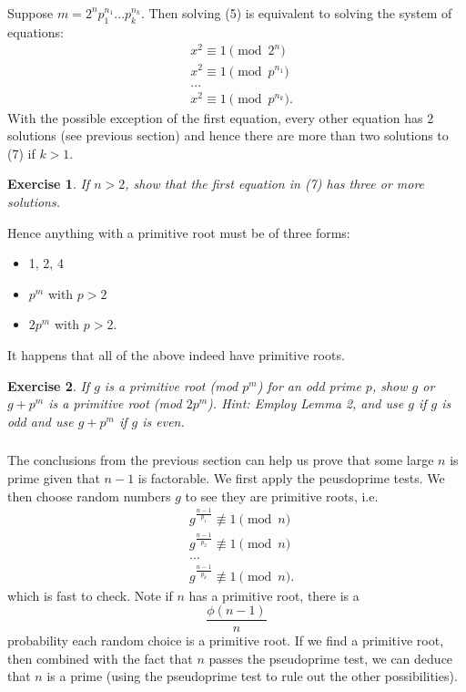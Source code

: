 \documentclass{article}
\newtheorem{exercise}{Exercise}
\begin{document}
\subsubsection{}
Suppose $m = 2^{n}p_{1}^{n_{1}}...p_{k}^{n_{k}}$. Then solving (5) is equivalent to solving the system of equations:
\begin{equation}
\begin{split}
    &x^{2} \equiv 1 \pmod{2^{n}}\\
    &x^{2} \equiv 1 \pmod{p^{n_{1}}}\\
    &. . .\\
    &x^{2} \equiv 1 \pmod{p^{n_{k}}}.
\end{split}
\end{equation}
With the possible exception of the first equation, every other equation has 2 solutions (see previous section) and hence there are more than two solutions to (7) if $k > 1$.
\begin{exercise}
    If $n > 2$, show that the first equation in (7) has three or more solutions.
\end{exercise}
Hence anything with a primitive root must be of three forms:
\begin{itemize}
    \item 1, 2, 4
    \item $p^{m}$ with $p > 2$
    \item $2p^{m}$ with $p > 2$.
\end{itemize}
It happens that all of the above indeed have primitive roots.
\begin{exercise}
    If $g$ is a primitive root (mod $p^{m}$) for an odd prime $p$, show $g$ or $g + p^{m}$ is a primitive root (mod $2p^{m}$). Hint: Employ Lemma 2, and use $g$ if $g$ is odd and use $g + p^{m}$ if $g$ is even.
\end{exercise}
\subsubsection{}
The conclusions from the previous section can help us prove that some large $n$ is prime given that $n-1$ is factorable. We first apply the peusdoprime tests. We then choose random numbers $g$ to see they are primitive roots, i.e. 
\begin{equation}
\begin{split}
    &g^{\frac{n-1}{p_{1}}} \not \equiv 1 \pmod{n}\\
    &g^{\frac{n-1}{p_{2}}} \not \equiv 1 \pmod{n}\\
    &. . .\\
    &g^{\frac{n-1}{p_{k}}} \not \equiv 1 \pmod{n}.
\end{split}
\end{equation}
which is fast to check. Note if $n$ has a primitive root, there is a
\begin{equation}
    \frac{\phi(n-1)}{n}
\end{equation}
probability each random choice is a primitive root. If we find a primitive root, then combined with the fact that $n$ passes the pseudoprime test, we can deduce that $n$ is a prime (using the pseudoprime test to rule out the other possibilities).
\end{document}
